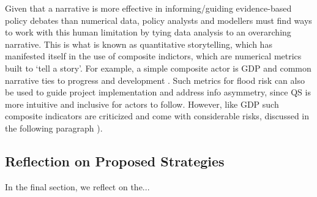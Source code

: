 Given that a narrative is more effective in informing/guiding evidence-based policy debates than numerical data, policy analysts and modellers must find ways to work with this human limitation by tying data analysis to an overarching narrative. This is what is known as quantitative storytelling, which has manifested itself in the use of composite indictors, which are numerical metrics built to ‘tell a story’. For example, a simple composite actor is GDP and common narrative ties to progress and development \parencite{kuc-czarnecka_quantitative_2020}. Such metrics for flood risk can also be used to guide project implementation and address info asymmetry, since QS is more intuitive and inclusive for actors to follow. However, like GDP such composite indicators are criticized and come with considerable risks, discussed in the following paragraph \parencite{kuc-czarnecka_quantitative_2020}).

\subsection{Reflection on Proposed Strategies}

In the final section, we reflect on the...

\bigskip

